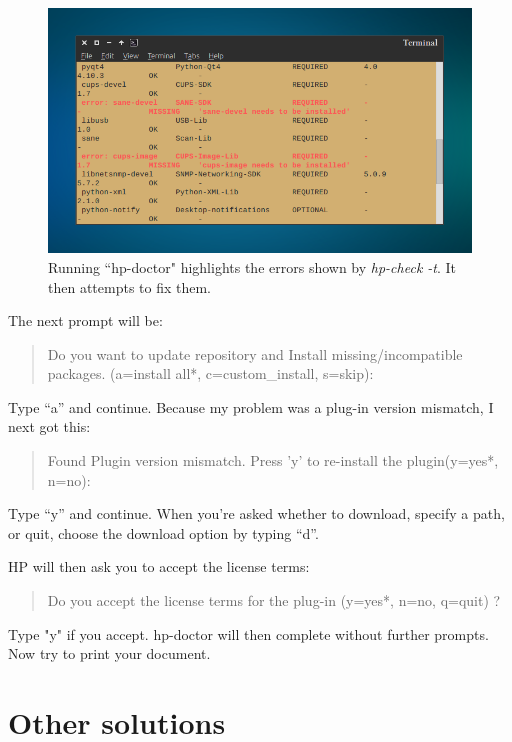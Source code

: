 \documentclass[12pt, a4paper]{article}
\begin{document}
\newpage
\begin{figure}[!htp]
  \centering
  \includegraphics[width=1\textwidth]{imgs/Filter_failed_11.png}
  \caption{Running ``hp-doctor" highlights the errors shown by \emph{hp-check -t}. It then attempts to fix them.}
  \label{fig10}
\end{figure}

\noindent The next prompt will be:

\begin{quote}
Do you want to update repository and Install missing/incompatible packages. (a=install all*, c=custom\_install, s=skip):
\end{quote}

\noindent Type “a” and continue. Because my problem was a plug-in version mismatch, I next got this:

\begin{quote}
Found Plugin version mismatch. Press 'y' to re-install the plugin(y=yes*, n=no):
\end{quote}

\noindent Type “y” and continue. When you're asked whether to download, specify a path, or quit, choose the download option by typing “d”.

HP will then ask you to accept the license terms:

\begin{quote}
Do you accept the license terms for the plug-in (y=yes*, n=no, q=quit) ? 
\end{quote}

\noindent Type "y" if you accept. hp-doctor will then complete without further prompts. Now try to print your document.

\section*{Other solutions}
\end{document}
